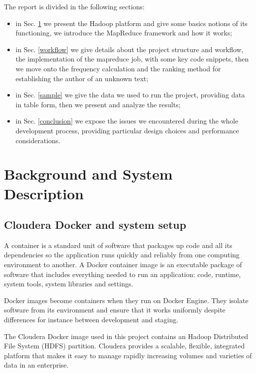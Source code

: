 \documentclass[a4paper,11pt, twoside]{article}
\begin{document}
	The report is divided in the following sections: \begin{itemize}
		\item in Sec. \ref{backg} we present the Hadoop platform and give some basics notions of its functioning, we introduce the MapReduce framework and how it works;
		\item in Sec. \ref{workflow} we give details about the project structure and workflow, the implementation of the mapreduce job, with some key code snippets, then we move onto the frequency calculation and the ranking method for establishing the author of an unknown text;
		\item in Sec. \ref{sample} we give the data we used to run the project, providing data in table form, then we present and analyze the results;
		\item in Sec. \ref{conclusion} we expose the issues we encountered during the whole development process, providing particular design choices and performance considerations.
	\end{itemize}

	\section{Background and System Description}\label{backg}
    \subsection{Cloudera Docker and system setup}
		A container is a standard unit of software that packages up code and all its dependencies so the application runs quickly and reliably from one computing environment to another. A Docker container image is an executable package of software that includes everything needed to run an application: code, runtime, system tools, system libraries and settings.

		\bigskip

		\noindent
		Docker images become containers when they run on Docker Engine. They isolate software from its environment and ensure that it works uniformly despite differences for instance between development and staging.
		
		\bigskip

		\noindent
		The Cloudera\parencite{Cloudera} Docker image used in this project contains an Hadoop Distributed File System (HDFS) partition. Cloudera provides a scalable, flexible, integrated platform that makes it easy to manage rapidly increasing volumes and varieties of data in an enterprise. 
\end{document}

